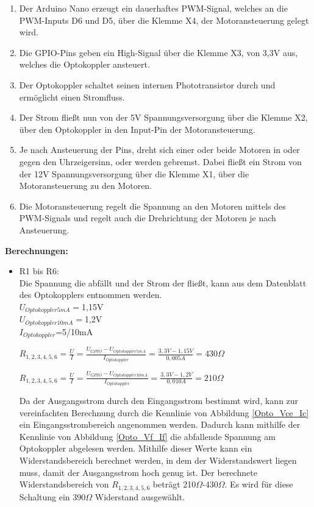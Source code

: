 \begin{enumerate}
\item Der Arduino Nano erzeugt ein dauerhaftes PWM-Signal, welches an die PWM-Inputs D6 und D5, über die Klemme X4, der Motoransteuerung gelegt wird.
\item Die GPIO-Pins geben ein High-Signal über die Klemme X3, von 3,3V aus, welches die Optokoppler ansteuert. 
\item Der Optokoppler schaltet seinen internen Phototransistor durch und ermöglicht einen Stromfluss.
\item Der Strom fließt nun von der 5V Spannungsversorgung über die Klemme X2, über den Optokoppler in den Input-Pin der Motoransteuerung.
\item Je nach Ansteuerung der Pins, dreht sich einer oder beide Motoren in oder gegen den Uhrzeigersinn, oder werden gebremst. Dabei fließt ein Strom von der 12V Spannungsversorgung über die Klemme X1, über die Motoransteuerung zu den Motoren.
\item Die Motoransteuerung regelt die Spannung an den Motoren mittels des PWM-Signals und regelt auch die Drehrichtung der Motoren je nach Ansteuerung.
\end{enumerate}
\textbf{Berechnungen:}
\begin{itemize}
\item R1 bis R6: \\
Die Spannung die abfällt und der Strom der fließt, kann aus dem Datenblatt des Optokopplers entnommen werden.\\
$U_{Optokoppler 5mA}=$1,15V \\
$U_{Optokoppler 10mA}=$1,2V \\
$I_{Optokoppler}$=5/10mA \\

\begin{center}
$R_{1,2,3,4,5,6}=\frac{U}{I}=\frac{U_{GPIO}-U_{Optokoppler 5mA}}{I_{Optokoppler}}=\frac{3,3V-1,15V}{0,005A}=430\Omega$
\end{center}

\begin{center}
$R_{1,2,3,4,5,6}=\frac{U}{I}=\frac{U_{GPIO}-U_{Optokoppler 10mA}}{I_{Optokoppler}}=\frac{3,3V-1,2V}{0,010A}=210\Omega$
\end{center}

Da der Ausgangsstrom durch den Eingangsstrom bestimmt wird, kann zur vereinfachten Berechnung durch die Kennlinie von Abbildung \ref{Opto_Vce_Ic} ein Eingangsstrombereich angenommen werden. Dadurch kann mithilfe der Kennlinie von Abbildung \ref{Opto_Vf_If} die abfallende Spannung am Optokoppler abgelesen werden. Mithilfe dieser Werte kann ein Widerstandsbereich berechnet werden, in dem der Widerstandswert liegen muss, damit der Ausgangsstrom hoch genug ist. Der berechnete Widerstandsbereich von $R_{1,2,3,4,5,6}$ beträgt 210$\Omega$-430$\Omega$. Es wird für diese Schaltung ein 390$\Omega$ Widerstand ausgewählt.
\end{itemize}

